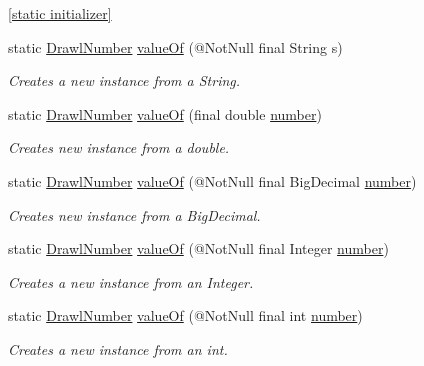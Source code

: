 \begin{DoxyCompactItemize}
\item 
\hyperlink{classcom_1_1aarrelaakso_1_1drawl_1_1_drawl_number_aad8d7aeb9f6e8f549e93b830b5ef5f8d}{\mbox{[}static initializer\mbox{]}}
\item 
static \hyperlink{classcom_1_1aarrelaakso_1_1drawl_1_1_drawl_number}{Drawl\+Number} \hyperlink{classcom_1_1aarrelaakso_1_1drawl_1_1_drawl_number_a368da87af7b1b38bd5185715afadcad6}{value\+Of} (@Not\+Null final String s)
\begin{DoxyCompactList}\small\item\em Creates a new instance from a String. \end{DoxyCompactList}\item 
static \hyperlink{classcom_1_1aarrelaakso_1_1drawl_1_1_drawl_number}{Drawl\+Number} \hyperlink{classcom_1_1aarrelaakso_1_1drawl_1_1_drawl_number_ad1ddd1e2141d9534bd7270093a9fa172}{value\+Of} (final double \hyperlink{classcom_1_1aarrelaakso_1_1drawl_1_1_drawl_number_a9fe9f40163a4f5581b35d61ecf63f278}{number})
\begin{DoxyCompactList}\small\item\em Creates new instance from a double. \end{DoxyCompactList}\item 
static \hyperlink{classcom_1_1aarrelaakso_1_1drawl_1_1_drawl_number}{Drawl\+Number} \hyperlink{classcom_1_1aarrelaakso_1_1drawl_1_1_drawl_number_aa32f1562e31e27ca9322b92babebd9b3}{value\+Of} (@Not\+Null final Big\+Decimal \hyperlink{classcom_1_1aarrelaakso_1_1drawl_1_1_drawl_number_a9fe9f40163a4f5581b35d61ecf63f278}{number})
\begin{DoxyCompactList}\small\item\em Creates new instance from a Big\+Decimal. \end{DoxyCompactList}\item 
static \hyperlink{classcom_1_1aarrelaakso_1_1drawl_1_1_drawl_number}{Drawl\+Number} \hyperlink{classcom_1_1aarrelaakso_1_1drawl_1_1_drawl_number_ade5aafecf2503e46fd21366d57eef286}{value\+Of} (@Not\+Null final Integer \hyperlink{classcom_1_1aarrelaakso_1_1drawl_1_1_drawl_number_a9fe9f40163a4f5581b35d61ecf63f278}{number})
\begin{DoxyCompactList}\small\item\em Creates a new instance from an Integer. \end{DoxyCompactList}\item 
static \hyperlink{classcom_1_1aarrelaakso_1_1drawl_1_1_drawl_number}{Drawl\+Number} \hyperlink{classcom_1_1aarrelaakso_1_1drawl_1_1_drawl_number_a1d775ac904124b03271461a325a7e232}{value\+Of} (@Not\+Null final int \hyperlink{classcom_1_1aarrelaakso_1_1drawl_1_1_drawl_number_a9fe9f40163a4f5581b35d61ecf63f278}{number})
\begin{DoxyCompactList}\small\item\em Creates a new instance from an int. \end{DoxyCompactList}\end{DoxyCompactItemize}
